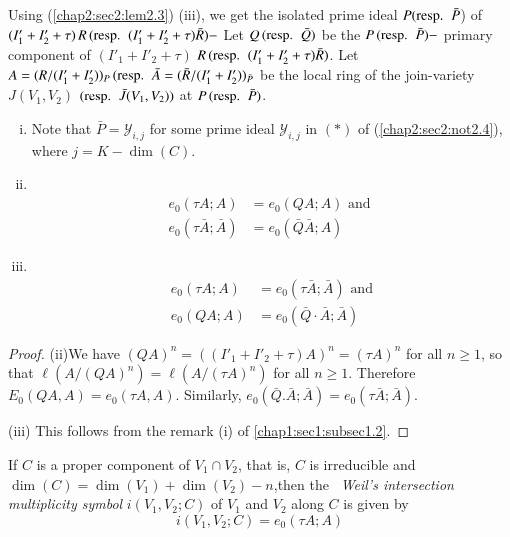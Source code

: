 Using (\ref{chap2:sec2:lem2.3}) (iii), we get the isolated prime ideal
$P (\text{{resp.}\kern.3em}~ 
\bar{P}$) of $(I'_{1} + I'_{2} + \tau)\, R \,(\text{{resp.}\kern.3em}~ (I'_{1} + I'_{2} +
\tau)\bar{R} )-$ Let $Q \,(\text{{resp.}\kern.3em}~ \bar{Q})$ be the
$P\,(\text{{resp.}\kern.3em}~ \bar{P}) - $ 
primary component of $(I'_{1} + I'_{2} + \tau)$  $R \,(\text{{resp.}\kern.3em}~ (I'_{1} +
I'_{2} + \tau)\bar{R})$. Let $A = (R/(I'_{1} + I'_{2}))_{P} \,(\text{{resp.}\kern.3em}~
\bar{A} = (\bar{R}/(I'_{1} + I'_{2}))_{\bar{P}}$ be the local ring of
the join-variety $J(V_{1}, V_{2})$ $(\text{{resp.}\kern.3em}~ \bar{J}(V_{1}, V_{2}))$ at $P
\,(\text{{resp.}\kern.3em}~ \bar{P})$.

\setcounter{remarks}{15}
\begin{remarks}\label{chap3:sec2:rem3.16}
  \begin{enumerate}[(i)] 
  \item Note that $\bar{P} = \mathscr{Y}_{i, j}$ for some prime ideal
    $\mathscr{Y}_{i,j}$ in $(*)$ of (\ref{chap2:sec2:not2.4}), where
    $j = K -\dim (C)$.  
  \item ~
    \vskip -1.5cm  
    \begin{align*}
      e_{0}(\tau A; A) &  = e_{0}(QA;A) \text{ and }\\
      e_{0} (\tau \bar{A};\bar{A}) &  = e_{0}(\bar{Q}\bar{A};A)
    \end{align*}
  \item ~
    \vskip -1.5cm 
    \begin{align*}
      e_{0}(\tau A; A) &  = e_{0}(\tau\bar{A};\bar{A}) \text{ and}\\
      e_{0} (Q A; A) &  = e_{0}(\bar{Q}\cdot \bar{A};\bar{A})
    \end{align*}
  \end{enumerate}
\end{remarks}

\begin{proof}
(ii)\pageoriginale We have $(QA)^{n} = ((I'_{1} + I'_{2} + \tau)A)^{n}
  = (\tau A)^n$ for all $n 
  \ge 1$, so that $\ell (A/(QA)^{n}) = \ell(A/(\tau A)^{n})$ for all
  $n \ge 1$. Therefore $E_{0}(Q A,A) = e_{0}(\tau A, A)$. Similarly,
  $e_{0}(\bar{Q}.\bar{A}; \bar{A}) = e_{0}(\tau \bar{A}; \bar{A})$.    

  (iii) This follows from the remark (i) of \ref{chap1:sec1:subsec1.2}. 
\end{proof}

\setcounter{remark}{16}
\begin{remark}\label{chap3:sec2:rem3.17}
  If $C$ is a proper component of $V_{1} \cap V_{2}$, that is, $C$ is
  irreducible and $\dim (C) = \dim (V_{1}) + \dim (V_{2}) - n$,then the
  ~\textit{Weil's intersection multiplicity symbol} $i (V_{1},
  V_{2};C)$ of $V_{1}$ and $V_{2}$ along $C$ is given by  
  $$
  i (V_{1}, V_{2};C) = e_{0}(\tau A;A)
  $$
\end{remark}

